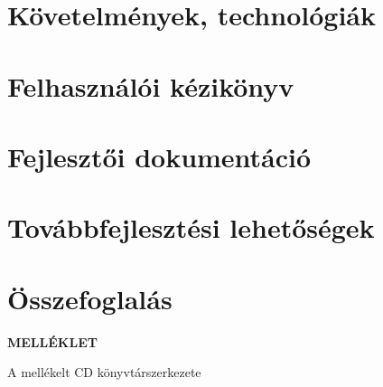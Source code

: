 \documentclass[a4paper,oneside,10pt]{report}
\begin{document}
\chapter{Követelmények, technológiák}
\label{kov}


\chapter{Felhasználói kézikönyv}
\label{felhaszn}


\chapter{Fejlesztői dokumentáció}
\label{fejl}


\chapter{Továbbfejlesztési lehetőségek}
\label{tovabbfejl}


\chapter{Összefoglalás}
\label{osszefogl}














\newpage

\Large
\begin{center}
	\textbf{MELLÉKLET}
\end{center}
\normalsize
\noindent
A mellékelt CD könyvtárszerkezete
\end{document}
